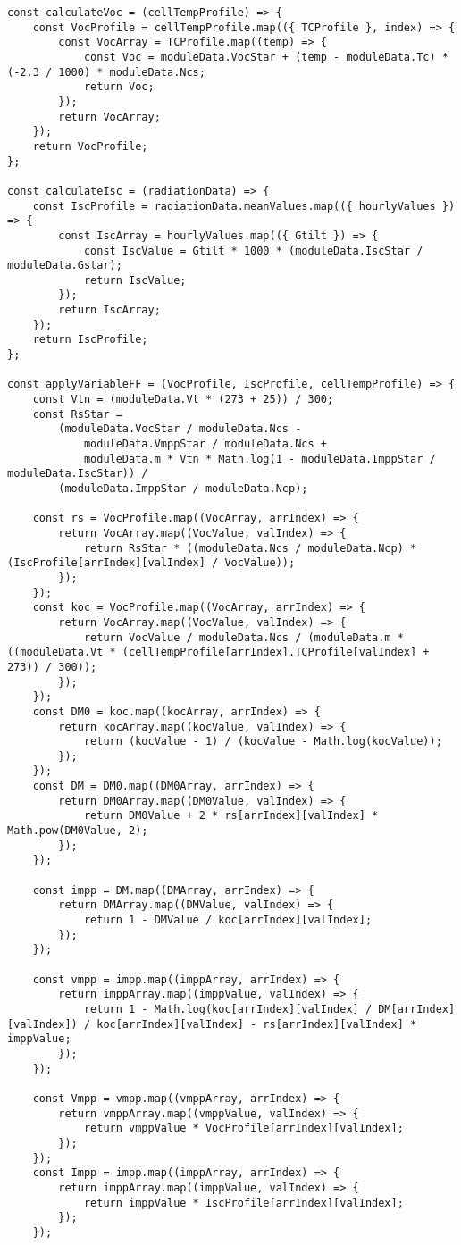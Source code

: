 \begin{lstlisting}[style=ES6, caption={public/scripts/DataAquisition.js}]
const calculateVoc = (cellTempProfile) => {
	const VocProfile = cellTempProfile.map(({ TCProfile }, index) => {
		const VocArray = TCProfile.map((temp) => {
			const Voc = moduleData.VocStar + (temp - moduleData.Tc) * (-2.3 / 1000) * moduleData.Ncs;
			return Voc;
		});
		return VocArray;
	});
	return VocProfile;
};

const calculateIsc = (radiationData) => {
	const IscProfile = radiationData.meanValues.map(({ hourlyValues }) => {
		const IscArray = hourlyValues.map(({ Gtilt }) => {
			const IscValue = Gtilt * 1000 * (moduleData.IscStar / moduleData.Gstar);
			return IscValue;
		});
		return IscArray;
	});
	return IscProfile;
};

const applyVariableFF = (VocProfile, IscProfile, cellTempProfile) => {
	const Vtn = (moduleData.Vt * (273 + 25)) / 300;
	const RsStar =
		(moduleData.VocStar / moduleData.Ncs -
			moduleData.VmppStar / moduleData.Ncs +
			moduleData.m * Vtn * Math.log(1 - moduleData.ImppStar / moduleData.IscStar)) /
		(moduleData.ImppStar / moduleData.Ncp);

	const rs = VocProfile.map((VocArray, arrIndex) => {
		return VocArray.map((VocValue, valIndex) => {
			return RsStar * ((moduleData.Ncs / moduleData.Ncp) * (IscProfile[arrIndex][valIndex] / VocValue));
		});
	});
	const koc = VocProfile.map((VocArray, arrIndex) => {
		return VocArray.map((VocValue, valIndex) => {
			return VocValue / moduleData.Ncs / (moduleData.m * ((moduleData.Vt * (cellTempProfile[arrIndex].TCProfile[valIndex] + 273)) / 300));
		});
	});
	const DM0 = koc.map((kocArray, arrIndex) => {
		return kocArray.map((kocValue, valIndex) => {
			return (kocValue - 1) / (kocValue - Math.log(kocValue));
		});
	});
	const DM = DM0.map((DM0Array, arrIndex) => {
		return DM0Array.map((DM0Value, valIndex) => {
			return DM0Value + 2 * rs[arrIndex][valIndex] * Math.pow(DM0Value, 2);
		});
	});

	const impp = DM.map((DMArray, arrIndex) => {
		return DMArray.map((DMValue, valIndex) => {
			return 1 - DMValue / koc[arrIndex][valIndex];
		});
	});

	const vmpp = impp.map((imppArray, arrIndex) => {
		return imppArray.map((imppValue, valIndex) => {
			return 1 - Math.log(koc[arrIndex][valIndex] / DM[arrIndex][valIndex]) / koc[arrIndex][valIndex] - rs[arrIndex][valIndex] * imppValue;
		});
	});

	const Vmpp = vmpp.map((vmppArray, arrIndex) => {
		return vmppArray.map((vmppValue, valIndex) => {
			return vmppValue * VocProfile[arrIndex][valIndex];
		});
	});
	const Impp = impp.map((imppArray, arrIndex) => {
		return imppArray.map((imppValue, valIndex) => {
			return imppValue * IscProfile[arrIndex][valIndex];
		});
	});


\end{lstlisting}
